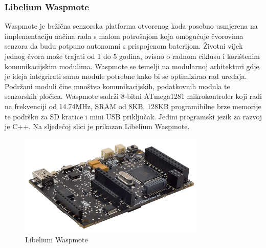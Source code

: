 \documentclass[times, utf8, diplomski]{fer}
\begin{document}
\subsubsection{Libelium Waspmote}
Waspmote\citep{Waspmote} je bežična senzorska platforma otvorenog koda posebno usmjerena na implementaciju načina rada s malom potrošnjom koja omogućuje čvorovima senzora da budu potpuno autonomni s prispojenom baterijom. Životni vijek jednog čvora može trajati od 1 do 5 godina, ovisno o radnom ciklusu i korištenim komunikacijskim modulima. Waspmote se temelji na modularnoj arhitekturi gdje je ideja integrirati samo module potrebne kako bi se optimizirao rad uređaja. Podržani moduli čine mnoštvo komunikacijskih, podatkovnih modula te senzorskih pločica. Waspmote sadrži 8-bitni ATmega1281 mikrokontroler koji radi na frekvenciji od 14.74MHz, SRAM od 8KB, 128KB programibilne brze memorije te podršku za SD kratice i mini USB priključak. Jedini programski jezik za razvoj je C++. Na sljedećoj slici je prikazan Libelium Waspmote.
\begin{figure}[htb]
    \centering
    \includegraphics[width=8.9cm]{images/waspmote.png}
    \caption{Libelium Waspmote\citep{Waspmote}}
    \label{fig:waspmote}
\end{figure}
\end{document}
